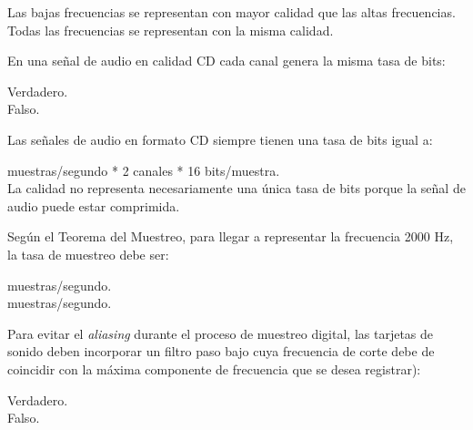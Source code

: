 \documentclass[legalpaper, 12pt, addpoints]{exam}
\begin{document}
\begin{questions}
\begin{oneparchoices}
  \choice Las bajas frecuencias se representan con mayor calidad que las altas frecuencias.\\
  \choice Todas las frecuencias se representan con la misma calidad.
\end{oneparchoices}
  
\vspace{0.10in}

\question En una señal de audio en calidad CD cada canal genera la misma tasa de bits:

\begin{oneparchoices}
  \choice Verdadero.\\
  \choice Falso.
\end{oneparchoices}
  
\vspace{0.10in}

\question Las señales de audio en formato CD siempre tienen una tasa de bits igual a:

\begin{oneparchoices}
   muestras/segundo * 2 canales * 16 bits/muestra.\\
  \choice La calidad no representa necesariamente una única tasa de
  bits porque la señal de audio puede estar comprimida.
\end{oneparchoices}
  
\vspace{0.10in}

\question Según el Teorema del Muestreo, para llegar a representar la
frecuencia 2000 Hz, la tasa de muestreo debe ser:

\begin{oneparchoices}
   muestras/segundo.\\
   muestras/segundo.
\end{oneparchoices}
  
\vspace{0.10in}

\question Para evitar el \emph{aliasing} durante el proceso de
muestreo digital, las tarjetas de sonido deben incorporar un filtro
paso bajo cuya frecuencia de corte debe de coincidir con la máxima
componente de frecuencia que se desea registrar):

\begin{oneparchoices}
  \choice Verdadero.\\
  \choice Falso.
\end{oneparchoices}
  

\end{questions}
\end{document}
